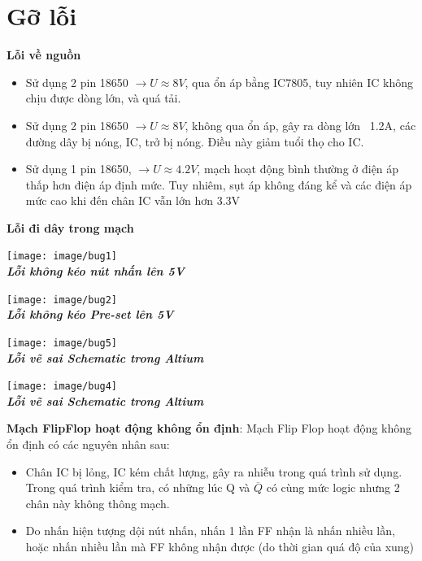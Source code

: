 \documentclass[10pt,a4paper]{report}
\begin{document}
\section{Gỡ lỗi}

\textbf{Lỗi về nguồn}
\begin{itemize}
	\item Sử dụng 2 pin 18650 $\to U \approx 8V$, qua ổn áp bằng IC7805, tuy nhiên IC không chịu được dòng lớn, và quá tải.
	\item  Sử dụng 2 pin 18650 $\to U \approx 8V$, không qua ổn áp, gây ra dòng lớn ~1.2A, các đường dây bị nóng, IC, trở bị nóng. Điều này giảm tuổi thọ cho IC.
	\item  Sử dụng 1 pin 18650, $\to U \approx 4.2V$, mạch hoạt động bình thường ở điện áp thấp hơn điện áp định mức. Tuy nhiêm, sụt áp không đáng kể và các điện áp mức cao khi đến chân IC vẫn lớn hơn 3.3V
\end{itemize}
\vspace{1cm}
\textbf{Lỗi đi dây trong mạch}
\begin{multicols}{2}
	\begin{center}
		\texttt{[image: image/bug1]}\\
		\textbf{\textit{Lỗi không kéo nút nhấn lên 5V}}
	\end{center}
	\begin{center}
		\texttt{[image: image/bug2]}\\
		\textit{\textbf{Lỗi không kéo Pre-set lên 5V}}
	\end{center}
	\begin{center}
		\texttt{[image: image/bug5]}\\
		\textbf{\textit{Lỗi vẽ sai Schematic trong Altium}}
	\end{center}
	\begin{center}
		\texttt{[image: image/bug4]}\\
		\textbf{\textit{Lỗi vẽ sai Schematic trong Altium}}
	\end{center}
\end{multicols}
\vspace{1cm}
\begin{flushleft}
	\textbf{Mạch FlipFlop hoạt động không ổn định}: Mạch Flip Flop hoạt động không ổn định có các nguyên nhân sau:
\end{flushleft}
\begin{itemize}
	\item Chân IC bị lỏng, IC kém chất lượng, gây ra nhiễu trong quá trình sử dụng. Trong quá trình kiểm tra, có những lúc Q và $\overline{Q}$ có cùng mức logic nhưng 2 chân này không thông mạch.
	\item Do nhấn hiện tượng dội nút nhấn, nhấn 1 lần FF nhận là nhấn nhiều lần, hoặc nhấn nhiều lần mà FF không nhận được (do thời gian quá độ của xung)
\end{itemize}
\end{document}

